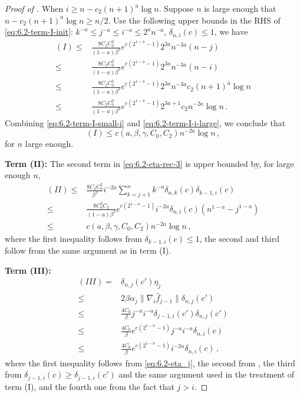 \documentclass[10pt,a4paper]{amsart}
\begin{document}
\begin{proof}[Proof of ]
When $i\ge n-c_2 (n+1)^a\log n$.  Suppose $n$ is large enough that $n-c_2(n+1)^a\log n\ge n/2$. Use the following upper bounds in the RHS of \eqref{eq:6.2-term-I-init}: 
$k^{-a}\le j^{-a}\le i^{-a}\le 2^{a} n^{-a}$, $\delta_{n,i}(c)\le 1$, we have
\begin{align}
   (I)\le  & \frac{8C_2 C_0^2 }{(1-a)\beta^3}e^{c(2^{1-a}-1)}2^{3a}n^{-3a}(n-j)\nonumber\\
    \le & \frac{8C_2 C_0^2 }{(1-a)\beta^3}e^{c(2^{1-a}-1)}2^{3a}n^{-3a}(n-i)\nonumber\\
    \le & \frac{8C_2 C_0^2 }{(1-a)\beta^3}e^{c(2^{1-a}-1)}2^{3a}n^{-3a}c_2(n+1)^a\log n\nonumber\\
    \le & \frac{8C_2 C_0^2 }{(1-a)\beta^3}e^{c(2^{1-a}-1)}2^{3a+1}c_2 n^{-2a}\log n\,.\label{eq:6.2-term-I-i-large}
\end{align}
Combining \eqref{eq:6.2-term-I-small-i} and \eqref{eq:6.2-term-I-i-large}, we conclude that
\begin{equation}
    \label{eq:6.2-term-I-final}
    (I)\le c(a,\beta,\gamma,C_0,C_2) n^{-2a}\log n\,,
\end{equation}
for $n$ large enough.

\textbf{Term (II):}
The second term in  \eqref{eq:6.2-eta-rec-3} is upper bounded by, for large enough $n$,
\begin{align}
  (II)\le &\frac{8 C_2 C_0^2 }{\beta^3}i^{-2a} \sum_{k=j+1}^n k^{-a} \delta_{n,k}(c)
 \delta_{k-1,i}(c)\nonumber\\
 \le & \frac{8 C_0^2 C_2}{(1-a)\beta^3} e^{c(2^{1-a}-1)}i^{-2a} \delta_{n,i}(c)(n^{1-a}-j^{1-a}) \nonumber\\
 \le & c(a,\beta,\gamma,C_0,C_2) n^{-2a}\log n\,,\label{eq:6.2-term-II-final}
\end{align}
where the first inequality follows from $\delta_{k-1,i}(c)\le 1$, the second and third follow from the same argument as in term (I).

\textbf{Term (III):}
\begin{align}
(III)=  &\delta_{n,j}(c')\eta_j\nonumber\\
\le & 2\beta\alpha_j \|\nabla_i\hat f_{j-1}\|\delta_{n,j}(c')\nonumber\\
\le & \frac{4C_0}{\beta}j^{-a}i^{-a}\delta_{j-1,i}(c')\delta_{n,j}(c')\nonumber\\
\le & \frac{4C_0}{\beta}e^{c(2^{1-a}-1)}j^{-a}i^{-a}\delta_{n,i}(c)\nonumber\\
\le & \frac{4C_0}{\beta}e^{c(2^{1-a}-1)}i^{-2a}\delta_{n,i}(c)\,,\label{eq:6.2-term-III-init}
\end{align}
where the first inequality follows from \eqref{eq:6.2-eta_j}, the second from , the third from $\delta_{j-1,i}(c)\ge \delta_{j-1,i}(c')$ and the same argument used in the treatment of term (I), and the fourth one from the fact that $j>i$. 


\end{proof}
\end{document}
